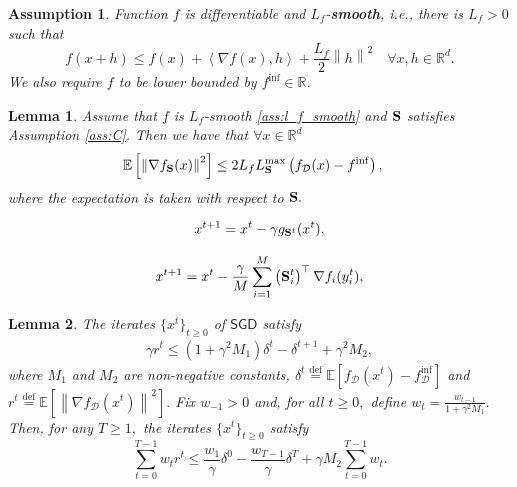 \documentclass[10pt,a4paper]{amsart}
\newtheorem{assumption}{Assumption}
\newtheorem{lemma}{Lemma}
\newcommand{\Exp}[1]{{\bb E}\left[#1\right]}
\newcommand{\R}{\bb R}
\newcommand{\bb}{\mathbb}
\newcommand{\eqdef}{\stackrel{\text{def}}{=}}
\newcommand{\mS}{{\bf S}}
\newcommand{\norm}[1]{\left\| #1 \right\|}
\newcommand{\tf}{f_{\mathcal{D}}}
\newcommand{\ve}[2]{\left\langle #1 ,  #2 \right\rangle}
\begin{document}
\begin{assumption} \label{ass:l_f_smooth}
	Function $f$ is differentiable and $L_f$-\textbf{smooth}, i.e., there is $L_f>0$ such that
	\[f(x+h) \leq f(x) + \ve{\nabla f(x)}{h} + \frac{L_f}{2}\norm{h}^2 \quad  \forall x, h \in \R^d.\]
	We also require $f$ to be lower bounded by $f^{\inf} \in \mathbb{R}$.
\end{assumption}

\begin{lemma} \label{lemma:ac}
	Assume that $f$ is $L_f$-smooth \eqref{ass:l_f_smooth} and $\mS$ satisfies Assumption \ref{ass:C}. Then we have that $\forall x\in\mathbb{R}^d$
	\begin{equation*}
		\begin{split}
			\Exp{\left\|\nabla f_{\mS}(x)\right\|^2} & \leq 2L_f L_{\mS}^{\max} \left(\tf(x) - f^{\inf}\right),
		\end{split}
	\end{equation*}
	where the expectation is taken with respect to $\mS.$
\end{lemma}

\begin{equation} \label{eq:abc_sgd}
	x^{t+1} = x^t - \gamma g_{\mS^t}(x^t),
\end{equation}

\begin{equation} \label{alg:finsum_noncvx}
	x^{t+1} = x^t - \frac{\gamma}{M} \sum_{i=1}^{M}\left(\mS_i^t\right)^{\top} \nabla f_i(y^t_i),
\end{equation}

\begin{lemma} \label{lemma:noncvx_weighted}
 The iterates $\{x^t\}_{t\geq 0}$ of $\mathsf{SGD}$ satisfy
	\begin{equation}\label{eq:initial_recursion}
		\begin{split}
			\gamma r^t \leq \left(1 + \gamma^2 M_1\right)\delta^t - \delta^{t+1} + \gamma^2 M_2,
		\end{split}
	\end{equation}
	where $M_1$ and $M_2$ are non-negative constants, $\delta^t\eqdef\mathbb{E}\left[\tf(x^t)-\tf^{\inf}\right]$ and $r^t\eqdef\mathbb{E}\left[\left\|\nabla \tf(x^t)\right\|^2\right].$ Fix $w_{-1}>0$ and, for all $t\geq 0,$ define $w_t=\frac{w_{t-1}}{1+\gamma^2M_1}.$ Then, for any $T\geq 1,$ the iterates $\{x^t\}_{t\geq 0}$ satisfy
	\begin{equation*}
		\sum_{t=0}^{T-1}w_tr^t \leq \frac{w_1}{\gamma}\delta^0 - \frac{w_{T-1}}{\gamma}\delta^T + \gamma M_2\sum_{t=0}^{T-1}w_t.
	\end{equation*}
\end{lemma}
\end{document}
